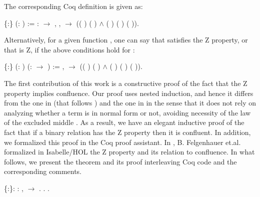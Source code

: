 The corresponding Coq definition is given as: \begin{coqdoccode}
\coqdocemptyline
\coqdocnoindent
{}  \{:\} (:  ) := \coqdoctac{\ensuremath{\exists}} : \ensuremath{\rightarrow} , \coqdockw{\ensuremath{\forall}}  ,    \ensuremath{\rightarrow} (( )  ( ) \ensuremath{\land} ( ) ( ) ( )).\coqdoceol
\coqdocemptyline
\end{coqdoccode}
Alternatively, for a given function , one can say that  satisfies the Z property, or that  is Z, if the above conditions hold for : \begin{coqdoccode}
\coqdocemptyline
\coqdocnoindent
{}  \{:\} (:  ) (:  \ensuremath{\rightarrow} ) := \coqdockw{\ensuremath{\forall}}  ,    \ensuremath{\rightarrow} (( )   ( ) \ensuremath{\land} ( ) ( ) ( )).\coqdoceol
\coqdocemptyline
\end{coqdoccode}
The first contribution of this work is a constructive proof of the
    fact that the Z property implies confluence. Our proof uses nested
    induction, and hence it differs from the one in \cite{kes09}
    (that follows \cite{dehornoy2008z}) and the one in \cite{zproperty} 
    in the sense that it does not rely on analyzing whether 
    a term is in normal form or not, avoiding necessity of 
    the law of the excluded middle . As a result, we have 
    an elegant inductive proof of the fact that if a binary relation
    has the Z property then it is confluent. In addition, we
    formalized this proof in the Coq proof assistant. In
    \cite{zproperty}, B. Felgenhauer et.al. formalized in Isabelle/HOL 
    the Z property and its relation to confluence. 
    In what follows, we present the theorem
    and its proof interleaving Coq code and the corresponding
    comments. \begin{coqdoccode}
\coqdocemptyline
\coqdocnoindent
{}  \{:\}: \coqdockw{\ensuremath{\forall}} :  ,   \ensuremath{\rightarrow}  .\coqdoceol
\coqdocnoindent
{}.\coqdoceol
\coqdocindent{1.00em}
  . \end{coqdoccode}
